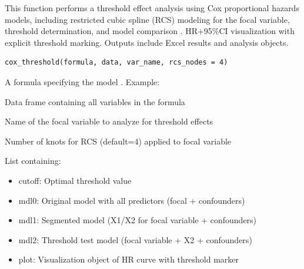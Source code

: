 \documentclass[a4paper]{book}
\begin{document}
%
\begin{Description}
This function performs a threshold effect analysis using Cox proportional hazards models,
including restricted cubic spline (RCS) modeling for the focal variable,
threshold determination, and model comparison .
HR+95\%CI visualization with explicit threshold marking.
Outputs include Excel results and analysis objects.
\end{Description}
%
\begin{Usage}
\begin{verbatim}
cox_threshold(formula, data, var_name, rcs_nodes = 4)
\end{verbatim}
\end{Usage}
%
\begin{Arguments}
\begin{ldescription}
\item[\code{formula}] A formula specifying the model .
Example: 

\item[\code{data}] Data frame containing all variables in the formula

\item[\code{var\_name}] Name of the focal variable to analyze for threshold effects

\item[\code{rcs\_nodes}] Number of knots for RCS (default=4) applied to focal variable
\end{ldescription}
\end{Arguments}
%
\begin{Value}
List containing:
\begin{itemize}

\item{} cutoff: Optimal threshold value
\item{} mdl0: Original model with all predictors (focal + confounders)
\item{} mdl1: Segmented model (X1/X2 for focal variable + confounders)
\item{} mdl2: Threshold test model (focal variable + X2 + confounders)
\item{} plot: Visualization object of HR curve with threshold marker

\end{itemize}

\end{Value}
\end{document}
